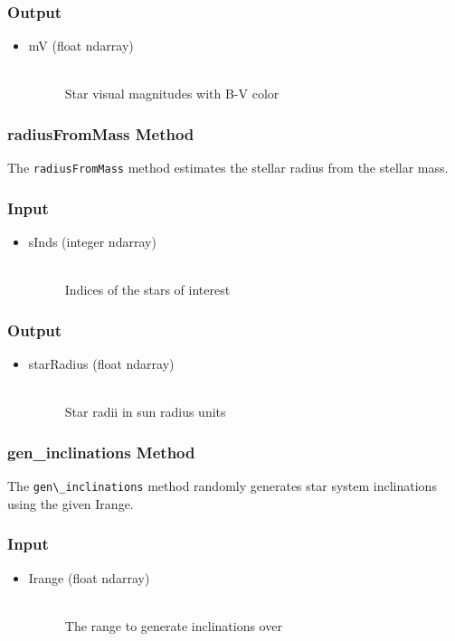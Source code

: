 \documentclass[cleanfoot]{asme2ej}
\begin{document}
\subsubsection*{Output}
\begin{itemize}
\item
\begin{description}
    \item[mV (float ndarray)] \hfill \\ Star visual magnitudes with B-V color
\end{description}
\end{itemize}

\subsubsection{radiusFromMass Method} \label{sec:radiusFromMasstask}
The \verb+radiusFromMass+ method estimates the stellar radius from the stellar mass.
\subsubsection*{Input}
\begin{itemize}
\item 
\begin{description}
    \item[sInds (integer ndarray)] \hfill \\ Indices of the stars of interest
\end{description}
\end{itemize}
\subsubsection*{Output}
\begin{itemize}
\item
\begin{description}
    \item[starRadius (float ndarray)] \hfill \\ Star radii in sun radius units
\end{description}
\end{itemize}

\subsubsection{gen\_inclinations Method} \label{sec:gen_inclinationstask}
The \verb+gen\_inclinations+ method randomly generates star system inclinations using the given Irange.
\subsubsection*{Input}
\begin{itemize}
\item 
\begin{description}
    \item[Irange (float ndarray)] \hfill \\ The range to generate inclinations over
\end{description}
\end{itemize}
\end{document}
